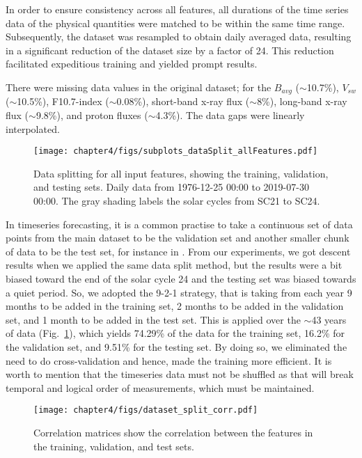 In order to ensure consistency across all features, all durations of the time series data of the physical quantities were matched to be within the same time range. Subsequently, the dataset was resampled to obtain daily averaged data, resulting in a significant reduction of the dataset size by a factor of 24. This reduction facilitated expeditious training and yielded prompt results.

There were missing data values in the original dataset; for the $B_{avg}$ ($\sim$10.7\%), $V_{sw}$ ($\sim$10.5\%), F10.7-index ($\sim$0.08\%), short-band x-ray flux ($\sim$8\%), long-band x-ray flux ($\sim$9.8\%), and proton fluxes ($\sim$4.3\%). The data gaps were linearly interpolated.

\begin{figure}[h!]
    \centerline{\texttt{[image: chapter4/figs/subplots\_dataSplit\_allFeatures.pdf]}}
    \caption{Data splitting for all input features, showing the training, validation, and testing sets. Daily data from 1976-12-25 00:00 to 2019-07-30 00:00. The gray shading labels the solar cycles from SC21 to SC24.}
\label{fig_allFeatures}
\end{figure}

In timeseries forecasting, it is a common practise to take a continuous set of data points from the main dataset to be the validation set and another smaller chunk of data to be the test set, for instance in \citet{pala_2019, benson_2020, zhang_2022, zhu_2022}. 
From our experiments, we got descent results when we applied the same data split method, but the results were a bit biased toward the end of the solar cycle 24 and the testing set was biased towards a quiet period. So, we adopted the 9-2-1 strategy, that is taking from each year 9 months to be added in the training set, 2 months to be added in the validation set, and 1 month to be added in the test set. This is applied over the $\sim$43 years of data (Fig.~\ref{fig_allFeatures}), which yields 74.29\% of the data for the training set, 16.2\% for the validation set, and 9.51\% for the testing set. By doing so, we eliminated the need to do cross-validation and hence, made the training more efficient.
It is worth to mention that the timeseries data must not be shuffled as that will break temporal and logical order of measurements, which must be maintained.

\begin{figure}[htp]
    \centerline{\texttt{[image: chapter4/figs/dataset\_split\_corr.pdf]}}
    \caption{Correlation matrices show the correlation between the features in the training, validation, and test sets.}
\label{fig_dataCorr}
\end{figure}

